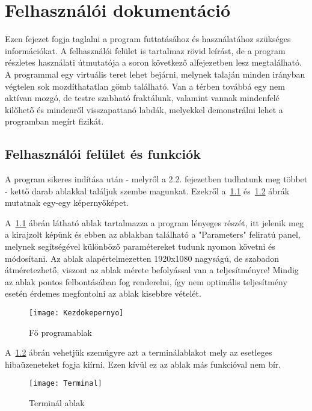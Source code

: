 \chapter{Felhasználói dokumentáció} %
\label{ch:user}

Ezen fejezet fogja taglalni a program futtatásához és használatához szükséges információkat. A felhasználói felület is tartalmaz rövid leírást, de a program részletes használati útmutatója a soron következő alfejezetben lesz megtalálható. A programmal egy virtuális teret lehet bejárni, melynek talaján minden irányban végtelen sok mozdíthatatlan gömb található. Van a térben továbbá egy nem aktívan mozgó, de testre szabható fraktálunk, valamint vannak mindenfelé kilőhető és mindenről visszapattanó labdák, melyekkel demonstrálni lehet a programban megírt fizikát.


\section{Felhasználói felület és funkciók} 

A program sikeres indítása után - melyről a 2.2. fejezetben tudhatunk meg többet - kettő darab ablakkal találjuk szembe magunkat. Ezekről a~\ref{fig:Kezdokepernyo} és~\ref{fig:Terminal} ábrák mutatnak egy-egy képernyőképet.

A~\ref{fig:Kezdokepernyo} ábrán látható ablak tartalmazza a program lényeges részét, itt jelenik meg a kirajzolt képünk és ebben az ablakban található a "Parameters" feliratú panel, melynek segítségével különböző paramétereket tudunk nyomon követni és módosítani. Az ablak alapértelmezetten 1920x1080 nagyságú, de szabadon átméretezhető, viszont az ablak mérete befolyással van a teljesítményre! Mindig az ablak pontos felbontásában fog renderelni, így nem optimális teljesítmény esetén érdemes megfontolni az ablak kisebbre vételét.

\begin{figure}[H]
	\centering
	\texttt{[image: Kezdokepernyo]}
	\caption{Fő programablak}
	\label{fig:Kezdokepernyo}
\end{figure}

A~\ref{fig:Terminal} ábrán vehetjük szemügyre azt a terminálablakot mely az esetleges hibaüzeneteket fogja kiírni. Ezen kívül ez az ablak más funkcióval nem bír.

\begin{figure}[H]
	\centering
	\texttt{[image: Terminal]}
	\caption{Terminál ablak}
	\label{fig:Terminal}
\end{figure}

